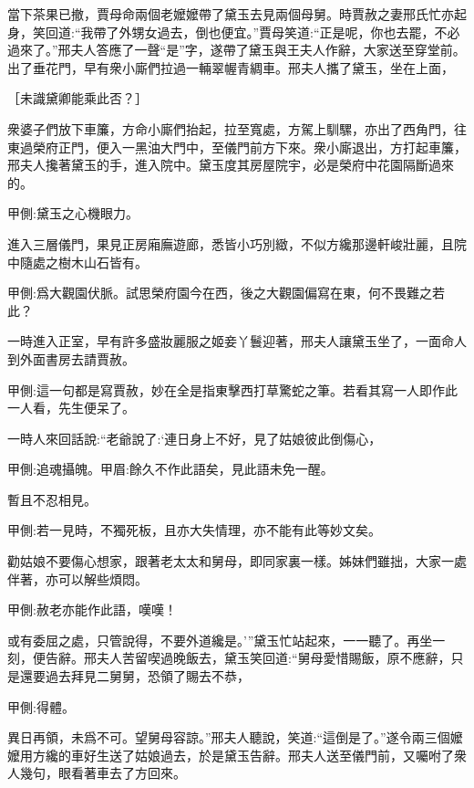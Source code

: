\begin{parag}
    當下茶果已撤，賈母命兩個老嬤嬤帶了黛玉去見兩個母舅。時賈赦之妻邢氏忙亦起身，笑回道:“我帶了外甥女過去，倒也便宜。”賈母笑道:“正是呢，你也去罷，不必過來了。”邢夫人答應了一聲“是”字，遂帶了黛玉與王夫人作辭，大家送至穿堂前。出了垂花門，早有衆小廝們拉過一輛翠幄青綢車。邢夫人攜了黛玉，坐在上面，\begin{note}［未識黛卿能乘此否？］\end{note}衆婆子們放下車簾，方命小廝們抬起，拉至寬處，方駕上馴騾，亦出了西角門，往東過榮府正門，便入一黑油大門中，至儀門前方下來。衆小廝退出，方打起車簾，邢夫人攙著黛玉的手，進入院中。黛玉度其房屋院宇，必是榮府中花園隔斷過來的。\begin{note}甲側:黛玉之心機眼力。\end{note}進入三層儀門，果見正房廂廡遊廊，悉皆小巧別緻，不似方纔那邊軒峻壯麗，且院中隨處之樹木山石皆有。\begin{note}甲側:爲大觀園伏脈。試思榮府園今在西，後之大觀園偏寫在東，何不畏難之若此？\end{note}一時進入正室，早有許多盛妝麗服之姬妾丫鬟迎著，邢夫人讓黛玉坐了，一面命人到外面書房去請賈赦。\begin{note}甲側:這一句都是寫賈赦，妙在全是指東擊西打草驚蛇之筆。若看其寫一人即作此一人看，先生便呆了。\end{note}一時人來回話說:“老爺說了:‘連日身上不好，見了姑娘彼此倒傷心，\begin{note}甲側:追魂攝魄。甲眉:餘久不作此語矣，見此語未免一醒。\end{note}暫且不忍相見。\begin{note}甲側:若一見時，不獨死板，且亦大失情理，亦不能有此等妙文矣。\end{note}勸姑娘不要傷心想家，跟著老太太和舅母，即同家裏一樣。姊妹們雖拙，大家一處伴著，亦可以解些煩悶。\begin{note}甲側:赦老亦能作此語，嘆嘆！\end{note}或有委屈之處，只管說得，不要外道纔是。’”黛玉忙站起來，一一聽了。再坐一刻，便告辭。邢夫人苦留喫過晚飯去，黛玉笑回道:“舅母愛惜賜飯，原不應辭，只是還要過去拜見二舅舅，恐領了賜去不恭，\begin{note}甲側:得體。\end{note}異日再領，未爲不可。望舅母容諒。”邢夫人聽說，笑道:“這倒是了。”遂令兩三個嬤嬤用方纔的車好生送了姑娘過去，於是黛玉告辭。邢夫人送至儀門前，又囑咐了衆人幾句，眼看著車去了方回來。
\end{parag}


